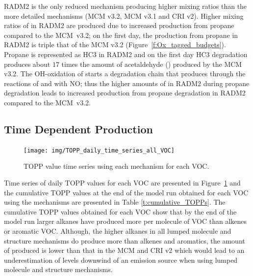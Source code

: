 RADM2 is the only reduced mechanism producing higher  mixing ratios than the more detailed mechanisms (MCM v3.2, MCM v3.1 and CRI v2).
Higher mixing ratios of  in RADM2 are produced due to increased  production from propane compared to the \mbox{MCM v3.2}; on the first day, the  production from propane in RADM2 is triple that of the MCM v3.2 \mbox{(Figure \ref{f:Ox_tagged_budgets})}.
Propane is represented as HC3 in RADM2 \citep{Stockwell:1990} and on the first day HC3 degradation produces about $17$ times the amount of acetaldehyde () produced by the MCM v3.2.
The OH-oxidation of  starts a degradation chain that produces  through the reactions of  and  with NO; thus the higher amounts of  in RADM2 during propane degradation leads to increased  production from propane degradation in RADM2 compared to the \mbox{MCM v3.2}.
%
\subsection[Time Dependent Ox Production]{Time Dependent  Production}
%
\begin{figure}
    \centering
    \caption{TOPP value time series using each mechanism for each VOC.}
    \texttt{[image: img/TOPP\_daily\_time\_series\_all\_VOC]}
    \vspace{-2mm}
    \label{f:TOPP_dailies}
\end{figure}
%
Time series of daily TOPP values for each VOC are presented in \mbox{Figure \ref{f:TOPP_dailies}} and the cumulative TOPP values at the end of the model run obtained for each VOC using the mechanisms are presented in Table \ref{t:cumulative_TOPPs}.
The cumulative TOPP values obtained for each VOC show that by the end of the model run larger alkanes have produced more  per molecule of VOC than alkenes or aromatic VOC.
Although, the higher alkanes in all lumped molecule and structure mechanisms do produce more  than alkenes and aromatics, the amount of  produced is lower than that in the MCM and CRI v2 which would lead to an underestimation of  levels downwind of an emission source when using lumped molecule and structure mechanisms.

